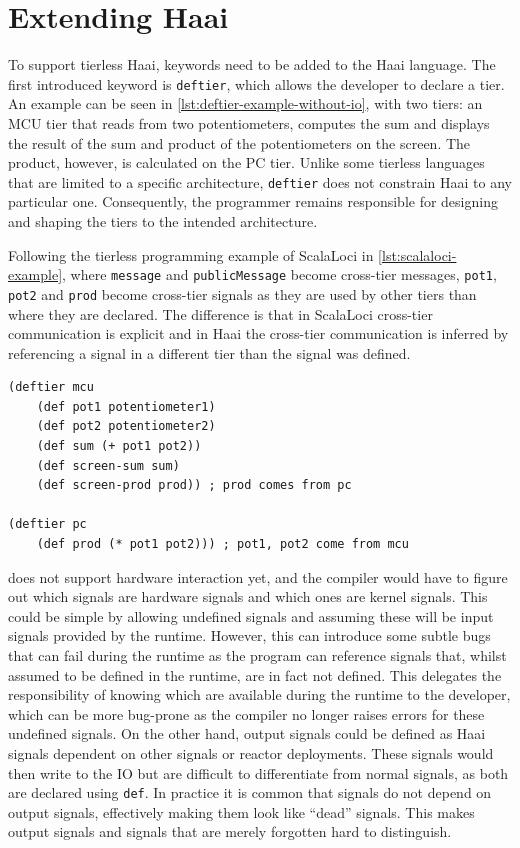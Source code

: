 \documentclass[a4paper]{book}
\begin{document}
\section{Extending Haai}
\label{sec:extending-haai}
To support tierless Haai, keywords need to be added to the Haai language. The
first introduced keyword is \texttt{deftier}, which allows the developer to declare a
tier. An example can be seen in \cref{lst:deftier-example-without-io}, with two
tiers: an MCU tier that reads from two potentiometers, computes the sum and
displays the result of the sum and product of the potentiometers on the screen.
The product, however, is calculated on the PC tier. Unlike some tierless languages that
are limited to a specific architecture, \texttt{deftier} does not constrain Haai
to any particular one. Consequently, the programmer remains responsible for designing
and shaping the tiers to the intended architecture.
\par
Following the tierless programming example of ScalaLoci in
\cref{lst:scalaloci-example}, where \texttt{message} and \texttt{publicMessage}
become cross-tier messages, \texttt{pot1}, \texttt{pot2} and \texttt{prod}
become cross-tier signals as they are used by other tiers than where they are
declared. The difference is that in ScalaLoci cross-tier communication is
explicit and in Haai the cross-tier communication is inferred by referencing a
signal in a different tier than the signal was defined.
\begin{listing}[ht]
	\begin{lstlisting}[language=Haai, morekeywords={deftier}, otherkeywords={\#:in,\#:out}]
(deftier mcu
    (def pot1 potentiometer1)
    (def pot2 potentiometer2)
    (def sum (+ pot1 pot2))
    (def screen-sum sum)
    (def screen-prod prod)) ; prod comes from pc

(deftier pc
    (def prod (* pot1 pot2))) ; pot1, pot2 come from mcu\end{lstlisting}
	\caption{Product sum distributed over two tiers without IO annotations}
	\label{lst:deftier-example-without-io}
\end{listing}
\par
{} does not support hardware interaction yet,
and the compiler would have to figure out which signals are hardware signals and
which ones are kernel signals. This could be simple by allowing undefined
signals and assuming these will be input signals provided by the runtime. However, this can
introduce some subtle bugs that can fail during the runtime as the program can
reference signals that, whilst assumed to be defined in the runtime, are in fact
not defined. This delegates the responsibility of knowing which are available
during the runtime to the developer, which can be more bug-prone as the compiler
no longer raises errors for these undefined signals. On the other hand, output
signals could be defined as Haai signals dependent on other signals or reactor
deployments. These signals would then write to the IO but are difficult to
differentiate from normal signals, as both are declared using \texttt{def}. In
practice it is common that signals do not depend on output signals, effectively
making them look like \enquote{dead} signals. This makes output signals and
signals that are merely forgotten hard to distinguish.
\end{document}
